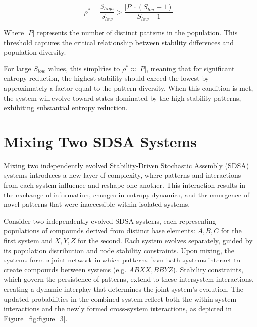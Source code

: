 \documentclass[preprint,12pt]{elsarticle}
\begin{document}
\begin{equation}
\rho^* = \frac{S_{high}}{S_{low}} > \frac{|P| \cdot (S_{low} + 1)}{S_{low} - 1}
\end{equation}

Where $|P|$ represents the number of distinct patterns in the population. This threshold captures the critical relationship between stability differences and population diversity. 

For large $S_{low}$ values, this simplifies to $\rho^* \approx |P|$, meaning that for significant entropy reduction, the highest stability should exceed the lowest by approximately a factor equal to the pattern diversity. When this condition is met, the system will evolve toward states dominated by the high-stability patterns, exhibiting substantial entropy reduction.


\section{Mixing Two SDSA Systems}

Mixing two independently evolved Stability-Driven Stochastic Assembly (SDSA) systems introduces a new layer of complexity, where patterns and interactions from each system influence and reshape one another. This interaction results in the exchange of information, changes in entropy dynamics, and the emergence of novel patterns that were inaccessible within isolated systems.

Consider two independently evolved SDSA systems, each representing populations of compounds derived from distinct base elements: \( A, B, C\) for the first system and \( X, Y, Z\) for the second. Each system evolves separately, guided by its population distribution and node stability constraints. Upon mixing, the systems form a joint network in which patterns from both systems interact to create compounds between systems (e.g. \( ABXX, BBYZ \)). Stability constraints, which govern the persistence of patterns, extend to these intersystem interactions, creating a dynamic interplay that determines the joint system's evolution. The updated probabilities in the combined system reflect both the within-system interactions and the newly formed cross-system interactions, as depicted in Figure~\ref{fig:figure_3}.
\end{document}
